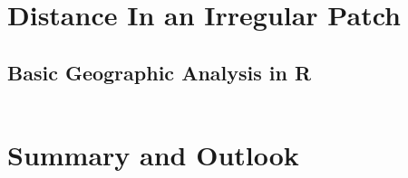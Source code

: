 \section{Distance In an Irregular Patch}
\label{ecoldist.sec.buffer}


\subsection{Basic Geographic Analysis in R}

\begin{figure}[h]
\begin{center}
\end{center}
\label{ecoldist.fig.corridor}
\end{figure}


\begin{table}
\centering
\begin{tabular}{crrrr}
\end{tabular}
\label{rsf.tab.fakecorridor}
\end{table}


\section{Summary and Outlook}



























